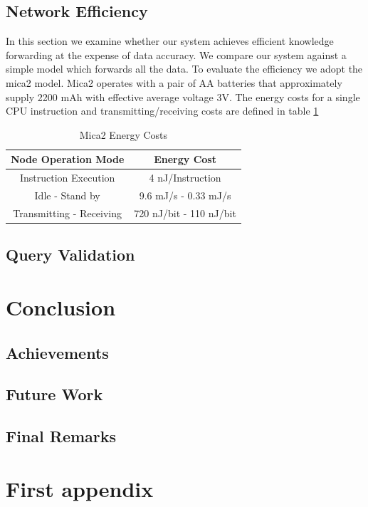 \documentclass{mproj}
\begin{document}
\section{Network Efficiency}
\label{sec:networkefficiency}
In this section we examine whether our system achieves efficient knowledge forwarding at the expense of data accuracy. We compare our system against a simple model which forwards all the data. To evaluate the efficiency we adopt the mica2 \cite{mica2} model. Mica2 operates with a pair of AA batteries that approximately supply 2200 mAh with effective average voltage 3V. The energy costs for a single CPU instruction and transmitting/receiving costs are defined in table \ref{table:energy}

 \begin{table}[!ht]
 \centering
 \begin{tabular}{||c | c||}
 \hline
 Node Operation Mode & Energy Cost \\
 \hline\hline
 Instruction Execution & 4 nJ/Instruction \\ 
 \hline
 Idle - Stand by & 9.6 mJ/s - 0.33 mJ/s\\
 \hline
 Transmitting - Receiving & 720 nJ/bit - 110 nJ/bit\\
 \hline
\end{tabular}
\caption{Mica2 Energy Costs}
 \label{table:energy} 
\end{table}



\section{Query Validation}

\chapter{Conclusion}
\label{conclusion}

\section{Achievements}

\section{Future Work}

\section{Final Remarks}

\appendix %

\chapter{First appendix}



\end{document}
